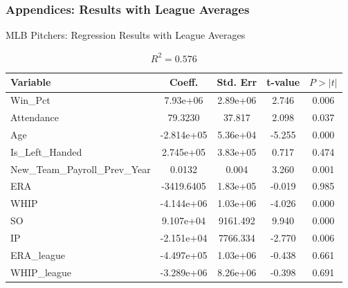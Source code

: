 \documentclass[9pt]{beamer}
\begin{document}
\begin{frame}
    \frametitle{Appendices: Results with League Averages} 
    \begin{block}{MLB Pitchers: Regression Results with League Averages}
        \begin{table}[ht]
            \centering
            \caption{$R^2 = 0.576$}
            \begin{tabular}{lcccc}
            \toprule
            Variable & Coeff. & Std. Err & t-value & $P > |t|$ \\
            \midrule
            \rowcolor{red!20} Win\_Pct & 7.93e+06 & 2.89e+06 & 2.746 & 0.006 \\
            \rowcolor{red!20} Attendance & 79.3230 & 37.817 & 2.098 & 0.037 \\
            \rowcolor{red!20} Age & -2.814e+05 & 5.36e+04 & -5.255 & 0.000 \\
            Is\_Left\_Handed & 2.745e+05 & 3.83e+05 & 0.717 & 0.474 \\
            \rowcolor{red!20} New\_Team\_Payroll\_Prev\_Year & 0.0132 & 0.004 & 3.260 & 0.001 \\
            ERA & -3419.6405 & 1.83e+05 & -0.019 & 0.985 \\
            \rowcolor{red!20} WHIP & -4.144e+06 & 1.03e+06 & -4.026 & 0.000 \\
            \rowcolor{red!20} SO & 9.107e+04 & 9161.492 & 9.940 & 0.000 \\
            \rowcolor{red!20} IP & -2.151e+04 & 7766.334 & -2.770 & 0.006 \\
            ERA\_league & -4.497e+05 & 1.03e+06 & -0.438 & 0.661 \\
            WHIP\_league & -3.289e+06 & 8.26e+06 & -0.398 & 0.691 \\
            \bottomrule
            \end{tabular}
        \end{table}
    \end{block}
\end{frame}
\end{document}
